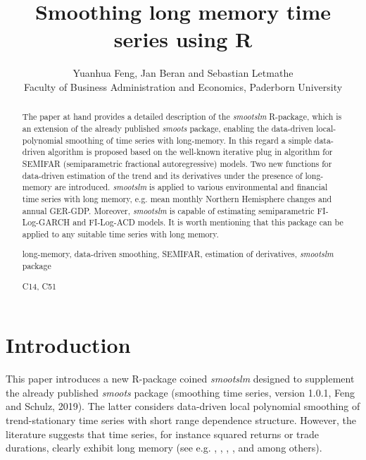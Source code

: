 \documentclass[12pt]{article}
\begin{document}
\title{Smoothing long memory time series using R}
\author{Yuanhua Feng, Jan Beran and Sebastian Letmathe\\ Faculty of Business Administration and Economics, Paderborn University}
\maketitle









\begin{abstract}
\noindent 
The paper at hand provides a detailed description of the \textit{smootslm} R-package, which is an extension of the already published \textit{smoots} package, enabling the data-driven local-polynomial smoothing of time series with long-memory. In this regard a simple data-driven algorithm is proposed based on the well-known iterative plug in algorithm for SEMIFAR (semiparametric fractional autoregressive) models. Two new functions for data-driven estimation of the trend and its derivatives under the presence of long-memory are introduced. \textit{smootslm} is applied to various environmental and financial time series with long memory, e.g. mean monthly Northern Hemisphere changes and annual GER-GDP. Moreover, \textit{smootslm} is capable of estimating semiparametric FI-Log-GARCH and FI-Log-ACD models. It is worth mentioning that this package can be applied to any suitable time series with long memory.

  
%

\vspace{.3cm}

 long-memory, data-driven smoothing, SEMIFAR, estimation of derivatives, \textit{smootslm} package


\vspace{.3cm}

 C14, C51
\end{abstract}


\newpage

\vspace{.5cm}


\section{Introduction}
This paper introduces a new R-package coined \textit{smootslm} designed to supplement the already published \textit{smoots} package (smoothing time series, version 1.0.1, Feng and Schulz, 2019). The latter considers data-driven local polynomial smoothing of trend-stationary time series with short range dependence structure. However, the literature suggests that time series, for instance squared returns or trade durations, clearly exhibit long memory (see e.g. \cite{ding1993long}, \cite{ding1996modeling}, \cite{andersen1997intraday}, \cite{andersen1999forecasting}, \cite{cotter2005uncovering} and \cite{beran2015modelling} among others).  
  
\end{document}
